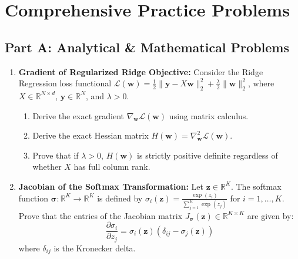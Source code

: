 \section{Comprehensive Practice Problems}

\subsection*{Part A: Analytical \& Mathematical Problems}

\begin{enumerate}[label=\textbf{P\arabic*.}]
    \item \textbf{Gradient of Regularized Ridge Objective:}
    Consider the Ridge Regression loss functional $\mathcal{L}(\mathbf{w}) = \frac{1}{2}\|\mathbf{y} - X\mathbf{w}\|_2^2 + \frac{\lambda}{2}\|\mathbf{w}\|_2^2$, where $X \in \mathbb{R}^{N \times d}$, $\mathbf{y} \in \mathbb{R}^N$, and $\lambda > 0$.
    \begin{enumerate}[label=(\alph*)]
        \item Derive the exact gradient $\nabla_{\mathbf{w}} \mathcal{L}(\mathbf{w})$ using matrix calculus.
        \item Derive the exact Hessian matrix $H(\mathbf{w}) = \nabla^2_{\mathbf{w}} \mathcal{L}(\mathbf{w})$.
        \item Prove that if $\lambda > 0$, $H(\mathbf{w})$ is strictly positive definite regardless of whether $X$ has full column rank.
    \end{enumerate}

    \item \textbf{Jacobian of the Softmax Transformation:}
    Let $\mathbf{z} \in \mathbb{R}^K$. The softmax function $\boldsymbol{\sigma}: \mathbb{R}^K \to \mathbb{R}^K$ is defined by $\sigma_i(\mathbf{z}) = \frac{\exp(z_i)}{\sum_{j=1}^K \exp(z_j)}$ for $i = 1, \dots, K$.
    Prove that the entries of the Jacobian matrix $J_{\boldsymbol{\sigma}}(\mathbf{z}) \in \mathbb{R}^{K \times K}$ are given by:
    \begin{equation}
    \frac{\partial \sigma_i}{\partial z_j} = \sigma_i(\mathbf{z}) \left( \delta_{ij} - \sigma_j(\mathbf{z}) \right)
    \end{equation}
    where $\delta_{ij}$ is the Kronecker delta.


\end{enumerate}
